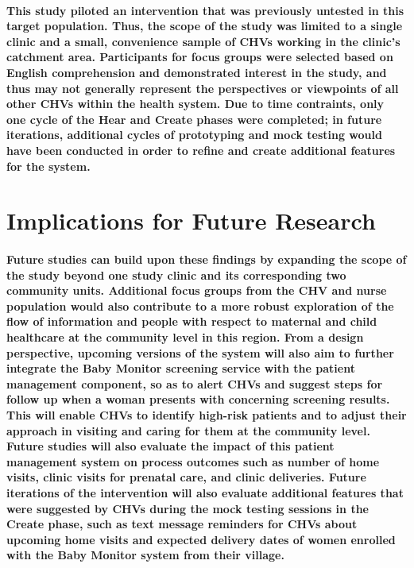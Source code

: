 \paragraph{This study piloted an intervention that was previously untested in this target population. Thus, the scope of the study was limited to a single clinic and a small, convenience sample of CHVs working in the clinic's catchment area. Participants for focus groups were selected based on English comprehension and demonstrated interest in the study, and thus may not generally represent the perspectives or viewpoints of all other CHVs within the health system. Due to time contraints, only one cycle of the Hear and Create phases were completed; in future iterations, additional cycles of prototyping and mock testing would have been conducted in order to refine and create additional features for the system.  }

\section{Implications for Future Research}
\paragraph{Future studies can build upon these findings by expanding the scope of the study beyond one study clinic and its corresponding two community units. Additional focus groups from the CHV and nurse population would also contribute to a more robust exploration of the flow of information and people with respect to maternal and child healthcare at the community level in this region. From a design perspective, upcoming versions of the system will also aim to further integrate the Baby Monitor screening service with the patient management component, so as to alert CHVs and suggest steps for follow up when a woman presents with concerning screening results. This will enable CHVs to identify high-risk patients and to adjust their approach in visiting and caring for them at the community level. Future studies will also evaluate the impact of this patient management system on process outcomes such as number of home visits, clinic visits for prenatal care, and clinic deliveries. Future iterations of the intervention will also evaluate additional features that were suggested by CHVs during the mock testing sessions in the Create phase, such as text message reminders for CHVs about upcoming home visits and expected delivery dates of women enrolled with the Baby Monitor system from their village. }


